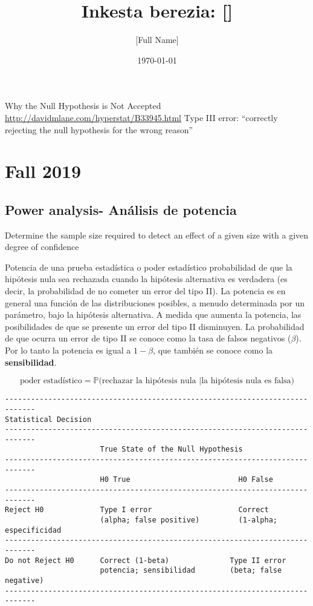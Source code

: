 \documentclass[10pt, oneside]{article}
\title{Inkesta berezia: []}
\author{[Full Name]}
\date{\today}
\begin{document}
\maketitle
\tableofcontents

\vspace{.25in}

Why the Null Hypothesis is Not Accepted
\url{http://davidmlane.com/hyperstat/B33945.html}
Type III error: ``correctly rejecting the null hypothesis for the wrong reason''

\section{Fall 2019}

\subsection{Power analysis- Análisis de potencia}

Determine the sample size required to detect an effect of a given size with a given degree of confidence

Potencia de una prueba estadística o poder estadístico
probabilidad de que la hipótesis nula sea rechazada cuando la hipótesis alternativa es verdadera (es decir, la probabilidad de no cometer un error del tipo II). La potencia es en general una función de las distribuciones posibles, a menudo determinada por un parámetro, bajo la hipótesis alternativa. A medida que aumenta la potencia, las posibilidades de que se presente un error del tipo II disminuyen. La probabilidad de que ocurra un error de tipo II se conoce como la tasa de falsos negativos ($\beta$). Por lo tanto la potencia es igual a $1-\beta$, que también se conoce como la \textbf{sensibilidad}.

\begin{equation}
\displaystyle {\mbox{poder estadístico}}=\mathbb {P} {\big (}{\mbox{rechazar la hipótesis nula }}{\big |}{\mbox{la hipótesis nula es falsa}}{\big )}
\end{equation}


\begin{verbatim}
-----------------------------------------------------------------------------
Statistical Decision
-----------------------------------------------------------------------------
                      True State of the Null Hypothesis
-----------------------------------------------------------------------------
                      H0 True                         H0 False
-----------------------------------------------------------------------------
Reject H0             Type I error                    Correct
                      (alpha; false positive)         (1-alpha; especificidad
-----------------------------------------------------------------------------
Do not Reject H0      Correct (1-beta)              Type II error
                      potencia; sensibilidad        (beta; false negative) 
-----------------------------------------------------------------------------                        
\end{verbatim}	
                         
\end{document}
